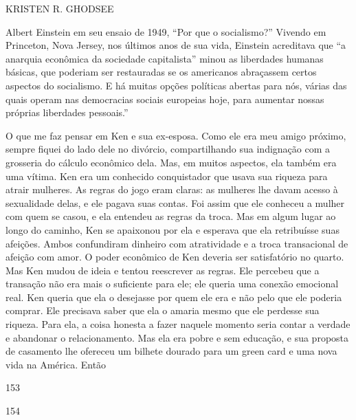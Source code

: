  \par 
KRISTEN R. GHODSEE
 \par 
Albert Einstein em seu ensaio de 1949, “Por que o socialismo?” Vivendo em Princeton, Nova Jersey, nos últimos anos de sua vida, Einstein acreditava que “a anarquia econômica da sociedade capitalista” minou as liberdades humanas básicas, que poderiam ser restauradas se os americanos abraçassem certos aspectos do socialismo. E há muitas opções políticas abertas para nós, várias das quais operam nas democracias sociais europeias hoje, para aumentar nossas próprias liberdades pessoais.”
 \par 
O que me faz pensar em Ken e sua ex-esposa. Como ele era meu amigo próximo, sempre fiquei do lado dele no divórcio, compartilhando sua indignação com a grosseria do cálculo econômico dela. Mas, em muitos aspectos, ela também era uma vítima. Ken era um conhecido conquistador que usava sua riqueza para atrair mulheres. As regras do jogo eram claras: as mulheres lhe davam acesso à sexualidade delas, e ele pagava suas contas. Foi assim que ele conheceu a mulher com quem se casou, e ela entendeu as regras da troca. Mas em algum lugar ao longo do caminho, Ken se apaixonou por ela e esperava que ela retribuísse suas afeições. Ambos confundiram dinheiro com atratividade e a troca transacional de afeição com amor. O poder econômico de Ken deveria ser satisfatório no quarto. Mas Ken mudou de ideia e tentou reescrever as regras. Ele percebeu que a transação não era mais o suficiente para ele; ele queria uma conexão emocional real. Ken queria que ela o desejasse por quem ele era e não pelo que ele poderia comprar. Ele precisava saber que ela o amaria mesmo que ele perdesse sua riqueza. Para ela, a coisa honesta a fazer naquele momento seria contar a verdade e abandonar o relacionamento. Mas ela era pobre e sem educação, e sua proposta de casamento lhe ofereceu um bilhete dourado para um green card e uma nova vida na América. Então
 \par 
153
 \par 
154
 \par 
